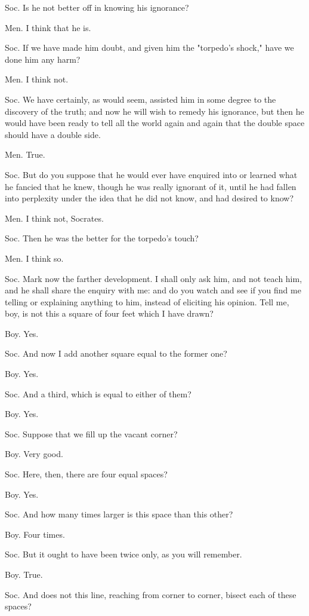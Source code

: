 Soc. Is he not better off in knowing his ignorance? 

Men. I think that he is. 

Soc. If we have made him doubt, and given him the "torpedo's shock,"
have we done him any harm? 

Men. I think not. 

Soc. We have certainly, as would seem, assisted him in some degree
to the discovery of the truth; and now he will wish to remedy his
ignorance, but then he would have been ready to tell all the world
again and again that the double space should have a double side.

Men. True. 

Soc. But do you suppose that he would ever have enquired into or learned
what he fancied that he knew, though he was really ignorant of it,
until he had fallen into perplexity under the idea that he did not
know, and had desired to know? 

Men. I think not, Socrates. 

Soc. Then he was the better for the torpedo's touch? 

Men. I think so. 

Soc. Mark now the farther development. I shall only ask him, and not
teach him, and he shall share the enquiry with me: and do you watch
and see if you find me telling or explaining anything to him, instead
of eliciting his opinion. Tell me, boy, is not this a square of four
feet which I have drawn? 

Boy. Yes. 

Soc. And now I add another square equal to the former one?

Boy. Yes. 

Soc. And a third, which is equal to either of them? 

Boy. Yes. 

Soc. Suppose that we fill up the vacant corner? 

Boy. Very good. 

Soc. Here, then, there are four equal spaces? 

Boy. Yes. 

Soc. And how many times larger is this space than this other?

Boy. Four times. 

Soc. But it ought to have been twice only, as you will remember.

Boy. True. 

Soc. And does not this line, reaching from corner to corner, bisect
each of these spaces? 

